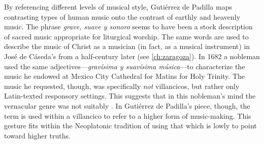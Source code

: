 By referencing different levels of musical style, Gutiérrez de Padilla maps
contrasting types of human music onto the contrast of earthly and heavenly
music.
The phrase \emph{grave, suave y sonoro} seems to have been a stock description
of sacred music appropriate for liturgical worship.%
    \Autocite
    [On \emph{suave} and other common vocabulary used for music in Spanish
    poetry of the period, see][]{UribeBracho:OrfeoPhD}
The same words are used to describe the music of Christ as a musician (in fact,
as a musical instrument) in José de Cáseda's  from a
half-century later (see \cref{ch:zaragoza}).
In 1682 a nobleman used the same adjectives---\emph{gravísima y suavísima
música}---to characterize the music he endowed at Mexico City Cathedral for
Matins for Holy Trinity.%
    \Autocite[140--141]{Goldman:Responsory}
The music he requested, though, was specifically \emph{not} villancicos, but
rather only Latin-texted responsory settings.
This suggests that in this nobleman's mind the vernacular genre was not suitably
.
In Gutiérrez de Padilla's piece, though, the term is used within a villancico to
refer to a higher form of music-making. 
This gesture fits within the Neoplatonic tradition of using that which is lowly
to point toward higher truths.

